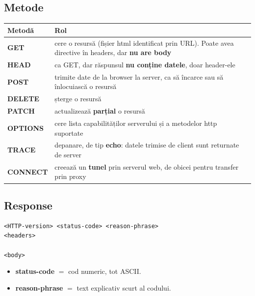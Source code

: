 \documentclass[11pt,a4paper]{article}
\begin{document}
\subsection*{Metode}
\renewcommand{\arraystretch}{1.3}
\begin{tabularx}{\linewidth}{@{}p{2.4cm} Y@{}}
\toprule
\textbf{Metodă} & \textbf{Rol}\\
\midrule
\textbf{GET} & cere o resursă (fișier html identificat prin URL). Poate avea directive în headers, dar \textbf{nu are body}\\
\textbf{HEAD} & ca GET, dar răspunsul \textbf{nu conține datele}, doar header-ele\\
\textbf{POST} & trimite date de la browser la server, ca să încarce sau să înlocuiască o resursă\\
\textbf{DELETE} & șterge o resursă\\
\textbf{PATCH} & actualizează \textbf{parțial} o resursă\\
\textbf{OPTIONS} & cere lista capabilităților serverului și a metodelor http suportate\\
\textbf{TRACE} & depanare, de tip \textbf{echo}: datele trimise de client sunt returnate de server\\
\textbf{CONNECT} & creează un \textbf{tunel} prin serverul web, de obicei pentru transfer prin proxy\\
\bottomrule
\end{tabularx}


\subsection*{Response}
\begin{lstlisting}
<HTTP-version> <status-code> <reason-phrase>
<headers>

<body>
\end{lstlisting}
\begin{itemize}
  \item \textbf{status-code} $=$ cod numeric, tot ASCII.
  \item \textbf{reason-phrase} $=$ text explicativ scurt al codului.
\end{itemize}
\end{document}
